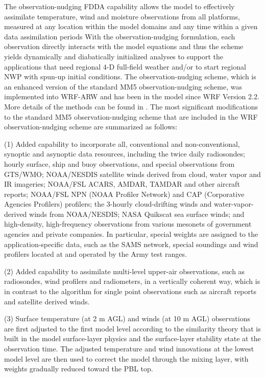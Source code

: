 The observation-nudging FDDA capability allows the model to effectively assimilate temperature, wind and moisture observations from all platforms, measured at any location within the model domains and any time within a given data assimilation periods With the observation-nudging formulation, each observation directly interacts with the model equations and thus the scheme yields dynamically and diabatically initialized analyses to support the applications that need regional 4-D full-field weather and/or to start regional NWP with spun-up initial conditions. The observation-nudging scheme, which is an enhanced version of the standard MM5 observation-nudging scheme, was implemented into WRF-ARW and has been in the model since WRF Version 2.2. 
More details of the methods can be found in \citet{liu08}.
The most significant modifications to the standard MM5 observation-nudging scheme \citep{stauffer94} that are included in the WRF observation-nudging scheme are summarized as follows:

(1) Added capability to incorporate all, conventional and  non-conventional, synoptic and asynoptic data resources, including the twice daily radiosondes; hourly surface, ship and buoy observations, and special observations from GTS/WMO; NOAA/NESDIS satellite winds derived from cloud, water vapor and IR imageries; NOAA/FSL ACARS, AMDAR, TAMDAR and other aircraft reports; NOAA/FSL NPN (NOAA Profiler Network) and CAP (Corporative Agencies Profilers) profilers; the 3-hourly cloud-drifting winds and water-vapor-derived winds from NOAA/NESDIS; NASA Quikscat sea surface winds; and high-density, high-frequency observations from various mesonets of government agencies and private companies. In particular, special weights are assigned to the application-specific data, such as the SAMS network, special soundings and wind profilers located at and operated by the Army test ranges. 

(2) Added capability to assimilate multi-level upper-air observations, such as radiosondes, wind profilers and radiometers, in a vertically coherent way, which is in contrast to the algorithm for single point observations such as aircraft reports and satellite derived winds. 

(3) Surface temperature (at 2 m AGL) and winds (at 10 m AGL) observations are first adjusted to the first model level according to the similarity theory that is built in the model surface-layer physics and the surface-layer stability state at the observation time. The adjusted temperature and wind innovations at the lowest model level are then used to correct the model through the mixing layer, with weights gradually reduced toward the PBL top. 

